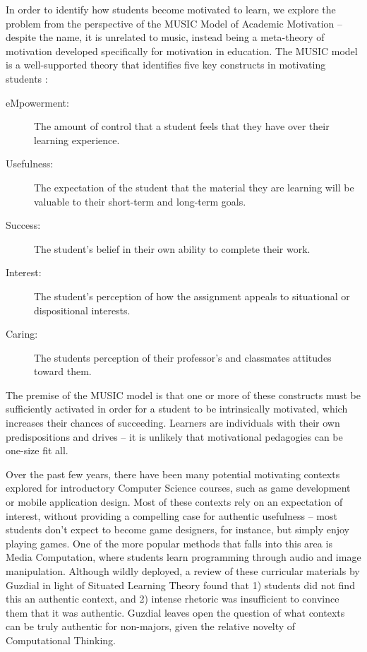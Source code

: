 \documentclass{sig-alternate}
\begin{document}
In order to identify how students become motivated to learn, we explore the problem from the perspective of the MUSIC Model of Academic Motivation -- despite the name, it is unrelated to music, instead being a meta-theory of motivation developed specifically for motivation in education.
The MUSIC model is a well-supported theory that identifies five key constructs in motivating students \cite{jones-description}:
\begin{description}
	\item[eMpowerment:] The amount of control that a student feels that they have over their learning experience.
	\item[Usefulness:] The expectation of the student that the material they are learning will be valuable to their short-term and long-term goals.
	\item[Success:] The student's belief in their own ability to complete their work.
	\item[Interest:] The student's perception of how the assignment appeals to situational or dispositional interests.
	\item[Caring:] The students perception of their professor's and classmates attitudes toward them.
\end{description}
The premise of the MUSIC model is that one or more of these constructs must be sufficiently activated in order for a student to be intrinsically motivated, which increases their chances of succeeding.
Learners are individuals with their own predispositions and drives -- it is unlikely that motivational pedagogies can be one-size fit all.

Over the past few years, there have been many potential motivating contexts explored for introductory Computer Science courses, such as game development or mobile application design. 
Most of these contexts rely on an expectation of interest, without providing a compelling case for authentic usefulness -- most students don't expect to become game designers, for instance, but simply enjoy playing games.
One of the more popular methods that falls into this area is Media Computation, where students learn programming through audio and image manipulation. 
Although wildly deployed, a review of these curricular materials by Guzdial \cite{guzdial2006imagineering} in light of Situated Learning Theory found that 1) students did not find this an authentic context, and 2) intense rhetoric was insufficient to convince them that it was authentic. 
Guzdial leaves open the question of what contexts can be truly authentic for non-majors, given the relative novelty of Computational Thinking.
\end{document}
